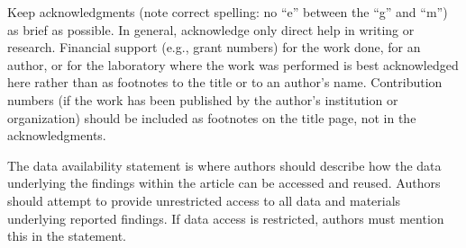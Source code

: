 \documentclass{ametsocV5}
\begin{document}
\acknowledgments
Keep acknowledgments (note correct spelling: no ``e'' between the ``g'' and
``m'') as brief as possible. In general, acknowledge only direct help in
writing or research. Financial support (e.g., grant numbers) for the work
done, for an author, or for the laboratory where the work was performed is
best acknowledged here rather than as footnotes to the title or to an
author's name. Contribution numbers (if the work has been published by the
author's institution or organization) should be included as footnotes on the title page,
not in the acknowledgments.

% 
%
\datastatement
The data availability statement is where authors should describe how the data underlying 
the findings within the article can be accessed and reused. Authors should attempt to 
provide unrestricted access to all data and materials underlying reported findings. 
If data access is restricted, authors must mention this in the statement.

%




\end{document}
